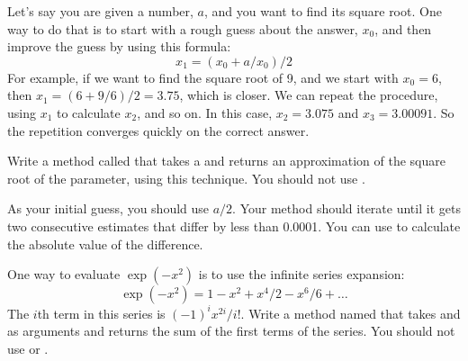 \begin{exercise}  %

Let's say you are given a number, $a$, and you want to find its square root.
One way to do that is to start with a rough guess about the answer, $x_0$, and then improve the guess by using this formula:
%
\[ x_1 =(x_0 + a/x_0) / 2 \]
%
For example, if we want to find the square root of 9, and we start with $x_0 = 6$, then $x_1 = (6 + 9/6) / 2 = 3.75$, which is closer.
We can repeat the procedure, using $x_1$ to calculate $x_2$, and so on.
In this case, $x_2 = 3.075$ and $x_3 = 3.00091$.
So the repetition converges quickly on the correct answer.

Write a method called  that takes a  and returns an approximation of the square root of the parameter, using this technique.
You should not use .

As your initial guess, you should use $a/2$.
Your method should iterate until it gets two consecutive estimates that differ by less than 0.0001.
You can use  to calculate the absolute value of the difference.

\end{exercise}


\begin{exercise}  %

One way to evaluate $\exp(-x^2)$ is to use the infinite series expansion:
%
\[ \exp(-x^2) = 1 - x^2 + x^4/2 - x^6/6 + \ldots \]
%
The $i$th term in this series is $(-1)^i x^{2i} / i!$.
Write a method named  that takes  and  as arguments and returns the sum of the first  terms of the series.
You should not use  or .

\end{exercise}

